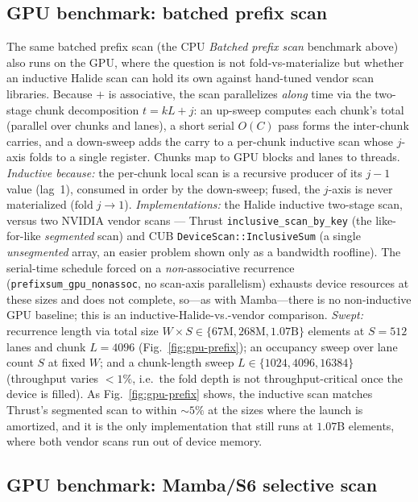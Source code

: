 \subsection{GPU benchmark: batched prefix scan}

The same batched prefix scan (the CPU \emph{Batched prefix scan} benchmark above)
also runs on the GPU, where the
question is not fold-vs-materialize but whether an inductive Halide scan can hold
its own against hand-tuned vendor scan libraries. Because $+$ is associative, the
scan parallelizes \emph{along} time via the two-stage chunk decomposition
$t=kL+j$: an up-sweep computes each chunk's total (parallel over chunks and
lanes), a short serial $O(C)$ pass forms the inter-chunk carries, and a down-sweep
adds the carry to a per-chunk inductive scan whose $j$-axis folds to a single
register. Chunks map to GPU blocks and lanes to threads.
\emph{Inductive because:} the per-chunk local scan is a recursive producer of its
$j{-}1$ value (lag~1), consumed in order by the down-sweep; fused, the $j$-axis is
never materialized ($\mathrm{fold}\;j\!\to\!1$).
\emph{Implementations:} the Halide inductive two-stage scan, versus two NVIDIA
vendor scans --- Thrust \texttt{inclusive\_scan\_by\_key} (the like-for-like
\emph{segmented} scan) and CUB \texttt{DeviceScan::InclusiveSum} (a single
\emph{unsegmented} array, an easier problem shown only as a bandwidth roofline).
The serial-time schedule forced on a \emph{non}-associative recurrence
(\texttt{prefixsum\_gpu\_nonassoc}, no scan-axis parallelism) exhausts device
resources at these sizes and does not complete, so---as with Mamba---there is no
non-inductive GPU baseline; this is an inductive-Halide-vs.-vendor comparison.
\emph{Swept:} recurrence length via total size $W\!\times\!S \in
\{67\mathrm{M}, 268\mathrm{M}, 1.07\mathrm{B}\}$ elements at $S{=}512$ lanes and
chunk $L{=}4096$ (Fig.~\ref{fig:gpu-prefix}); an occupancy sweep over lane count
$S$ at fixed $W$; and a chunk-length sweep $L\in\{1024,4096,16384\}$ (throughput
varies ${<}1\%$, i.e.\ the fold depth is not throughput-critical once the device
is filled). As Fig.~\ref{fig:gpu-prefix} shows, the inductive scan matches Thrust's
segmented scan to within ${\sim}5\%$ at the sizes where the launch is amortized,
and it is the only implementation that still runs at $1.07$B elements, where both
vendor scans run out of device memory.



\subsection{GPU benchmark: Mamba/S6 selective scan}

